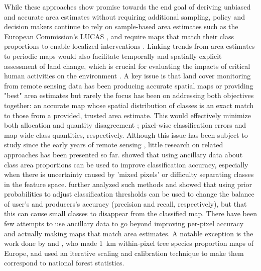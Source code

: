     While these approaches show promise towards the end goal of deriving unbiased and accurate area estimates without requiring additional sampling, policy and decision makers continue to rely on sample-based area estimates such as the European Commission's LUCAS \citep{gallego2017copernicus}, and require maps that match their class proportions to enable localized interventions \citep{olofsson2014good}. Linking trends from area estimates to periodic maps would also facilitate temporally and spatially explicit assessment of land change, which is crucial for evaluating the impacts of critical human activities on the environment \citep{olofsson2014good,szantoi2020addressing,winkler2021global}. A key issue is that land cover monitoring from remote sensing data has been producing accurate spatial maps or providing "best" area estimates but rarely the focus has been on addressing both objectives together: an accurate map whose spatial distribution of classes is an exact match to those from a provided, trusted area estimate. This would effectively minimize both allocation and quantity disagreement \citep{pontius2011death}; pixel-wise classification errors and map-wide class quantities, respectively. Although this issue has been subject to study since the early years of remote sensing \citep{strahler1980use}, little research on related approaches has been presented so far. \citet{janssen1992knowledge} showed that using ancillary data about class area proportions can be used to improve classification accuracy, especially when there is uncertainty caused by 'mixed pixels' or difficulty separating classes in the feature space. \citet{mingguo2009effect} further analyzed such methods and showed that using prior probabilities to adjust classification thresholds can be used to change the balance of user's and producers's accuracy (precision and recall, respectively), but that this can cause small classes to disappear from the classified map. There have been few attempts to use ancillary data to go beyond improving per-pixel accuracy and actually making maps that match area estimates. A notable exception is the work done by \citet{troltzsch2009spatial} and \citet{brus2012statistical}, who made 1~km within-pixel tree species proportion maps of Europe, and used an iterative scaling and calibration technique to make them correspond to national forest statistics. 
    

